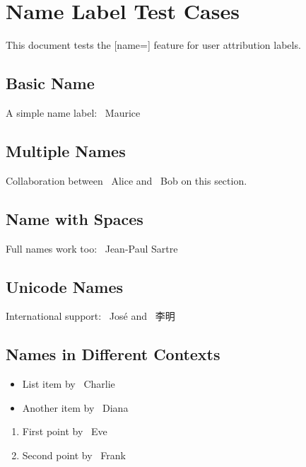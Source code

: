 \section{Name Label Test Cases}\label{name-label-test-cases}

This document tests the {[}name={]} feature for user attribution labels.

\subsection{Basic Name}\label{basic-name}

A simple name label: {\small \faUser\ Maurice}

\subsection{Multiple Names}\label{multiple-names}

Collaboration between {\small \faUser\ Alice} and {\small \faUser\ Bob}
on this section.

\subsection{Name with Spaces}\label{name-with-spaces}

Full names work too: {\small \faUser\ Jean-Paul Sartre}

\subsection{Unicode Names}\label{unicode-names}

International support: {\small \faUser\ José} and {\small \faUser\ 李明}

\subsection{Names in Different
Contexts}\label{names-in-different-contexts}

\begin{itemize}
\tightlist
\item
  List item by {\small \faUser\ Charlie}
\item
  Another item by {\small \faUser\ Diana}
\end{itemize}

\begin{enumerate}
\def\labelenumi{\arabic{enumi}.}
\tightlist
\item
  First point by {\small \faUser\ Eve}
\item
  Second point by {\small \faUser\ Frank}
\end{enumerate}

